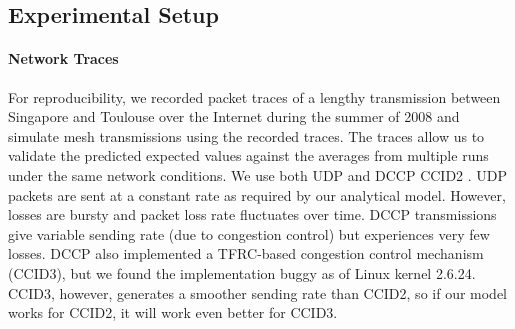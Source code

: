 \subsection{Experimental Setup}

    
\paragraph*{Network Traces}
For reproducibility, we recorded packet traces of a lengthy transmission 
between Singapore and Toulouse over the Internet during the summer of 2008 
and simulate mesh transmissions using the recorded traces.  The traces allow 
us to validate the predicted expected values against the averages from 
multiple runs under the same network conditions.    
We use both UDP and DCCP CCID2 \cite{dccp06}.  UDP packets are sent at a constant 
rate as required by our analytical model.  However, losses are bursty and packet 
loss rate fluctuates over time.  DCCP transmissions give variable sending rate
(due to congestion control)
but experiences very few losses.
DCCP also implemented a TFRC-based congestion control mechanism (CCID3), 
but we found the implementation buggy as of Linux kernel 2.6.24.
CCID3, however, generates a smoother sending rate than CCID2, so if our model works for CCID2,
it will work even better for CCID3.



